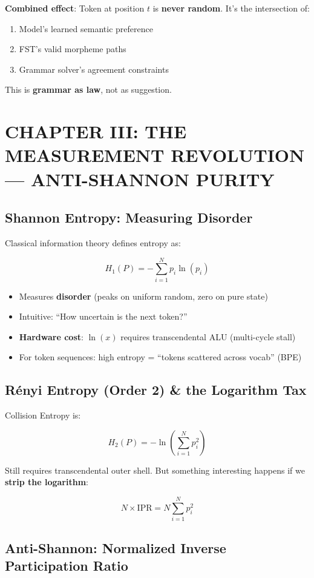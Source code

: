 \documentclass[11pt,oneside]{article}
\begin{document}
\textbf{Combined effect}: Token at position $t$ is \textbf{never random}. It's the intersection of:
\begin{enumerate}
  \item Model's learned semantic preference
  \item FST's valid morpheme paths
  \item Grammar solver's agreement constraints
\end{enumerate}

This is \textbf{grammar as law}, not as suggestion.

\section{CHAPTER III: THE MEASUREMENT REVOLUTION --- ANTI-SHANNON PURITY}

\subsection{Shannon Entropy: Measuring Disorder}

Classical information theory defines entropy as:

\[H_1(P) = -\sum_{i=1}^{N} p_i \ln(p_i)\]

\begin{itemize}
  \item Measures \textbf{disorder} (peaks on uniform random, zero on pure state)
  \item Intuitive: ``How uncertain is the next token?''
  \item \textbf{Hardware cost}: $\ln(x)$ requires transcendental ALU (multi-cycle stall)
  \item For token sequences: high entropy = ``tokens scattered across vocab'' (BPE)
\end{itemize}

\subsection{Rényi Entropy (Order 2) \& the Logarithm Tax}

Collision Entropy is:

\[H_2(P) = -\ln\left(\sum_{i=1}^{N} p_i^2\right)\]

Still requires transcendental outer shell. But something interesting happens if we \textbf{strip the logarithm}:

\[N \times \text{IPR} = N \sum_{i=1}^{N} p_i^2\]

\subsection{Anti-Shannon: Normalized Inverse Participation Ratio}
\end{document}
